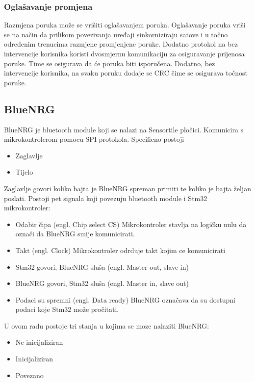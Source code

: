 \documentclass[times, utf8, diplomski]{diplomski}
\begin{document}
\subsubsection {Oglašavanje promjena}
Razmjena poruka može se vrišiti oglašavanjem poruka. Oglašavanje poruka vriši se na način da prilikom povezivanja uređaji sinkorniziraju satove i u točno određenim trenucima razmjene promjenjene poruke. Dodatno protokol na bez intervencije korisnika koristi dvosmjernu komunikaciju za osiguravanje prijenosa poruke. Time se osigurava da će poruka biti isporučena. Dodatno, bez intervencije korisnika, na svaku poruku dodaje se CRC čime se osigurava točnost poruke.

\subsection{BlueNRG}
BlueNRG je bluetooth module koji se nalazi na Sensortile pločici. Komunicira s mikrokontrolerom pomocu SPI protokola.
Specificno postoji

\begin{itemize}
  \item Zaglavlje
  \item Tijelo
\end{itemize}

Zaglavlje govori koliko bajta je BlueNRG spreman primiti te koliko je bajta željan poslati.
Postoji pet signala koji povezuju bluetooth module i Stm32 mikrokontroler:

\begin{itemize}
  \item Odabir čipa (engl. Chip select CS) Mikrokontroler stavlja na logičku nulu da označi da BlueNRG smije komunicirati.
  \item Takt (engl. Clock) Mikrokontroler odrduje takt kojim ce komunicirati
  \item Stm32 govori, BlueNRG sluša (engl. Master out, slave in)
  \item BlueNRG govori, Stm32 sluša (engl. Master in, slave out)
  \item Podaci su spremni (engl. Data ready) BlueNRG označava da su dostupni podaci koje Stm32 može pročitati.
\end{itemize}

U ovom radu postoje tri stanja u kojima se moze nalaziti BlueNRG:

\begin{itemize}
  \item Ne inicijaliziran
  \item Inicijaliziran
  \item Povezano
\end{itemize}
\end{document}

